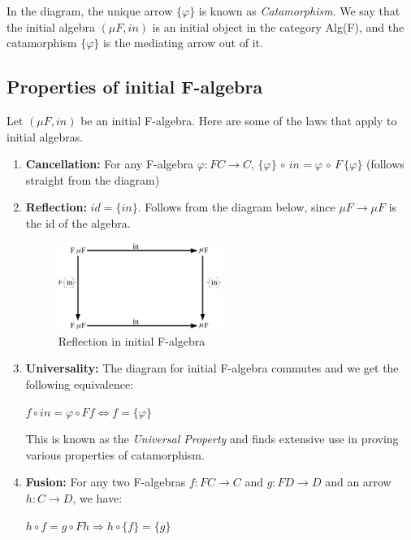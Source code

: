 \documentclass{article}
\begin{document}
In the diagram, the unique arrow $\{\varphi\}$ is known as \textit{Catamorphism}. We say that the initial algebra $(\mu F, in)$ is an initial object in the category Alg(F), and the catamorphism $\{\varphi\}$ is the mediating arrow out of it. 

\subsection{Properties of initial F-algebra}

Let $(\mu F, in)$ be an initial F-algebra. Here are some of the laws that apply to initial algebras.

\begin{enumerate}
\item{\textbf{Cancellation:} For any F-algebra $\varphi : FC \rightarrow C$, $\{\varphi\}\, \circ\, in = \varphi\, \circ\, F\, \{\varphi\}$ (follows straight from the diagram)}

\item{\textbf{Reflection:} $id = \{in\}$. Follows from the diagram below, since $\mu F \rightarrow \mu F$ is the id of the algebra.

\begin{figure}[htb]
\begin{center}
\includegraphics[width=0.5\textwidth]{figures/alg5}
\caption{Reflection in initial F-algebra}
\end{center}
\end{figure}

}
\item{\textbf{Universality:} The diagram for initial F-algebra commutes and we get the following equivalence:
\begin{center}
$f \circ in = \varphi \circ Ff  \Leftrightarrow f = \{\varphi\}$
\end{center}

This is known as the \textit{Universal Property} and finds extensive use in proving various properties of catamorphism. 
}
\item{\textbf{Fusion:} For any two F-algebras $f: FC \rightarrow C$ and $g: FD \rightarrow D$ and an arrow $h: C \rightarrow D$, we have:
\begin{center}
$h \circ f = g \circ F h \Rightarrow h \circ \{f\} = \{g\}$
\end{center}

}
\end{enumerate}
\end{document}
